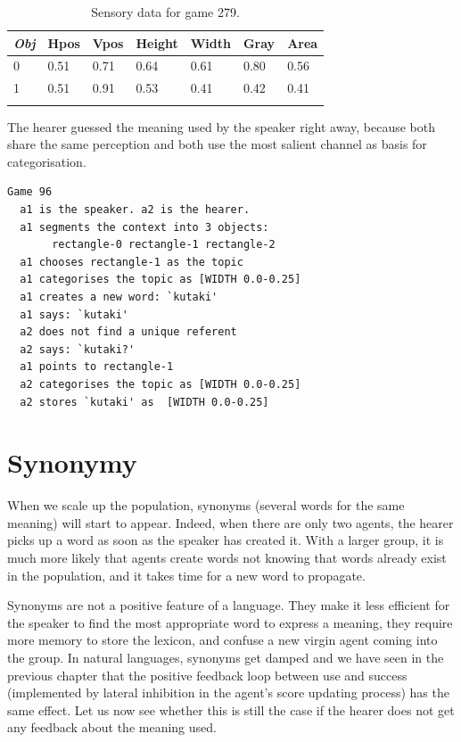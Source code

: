 \begin{table}
\begin{center}
\begin{tabular}{ l  l  l  l  l  l  l }
\lsptoprule
{\itshape Obj}&Hpos&Vpos&Height&Width&Gray&Area \\ \midrule
0 &0.51 & 0.71 & 0.64 & 0.61 & 0.80 & 0.56\\ 
1 & 0.51 & 0.91 & 0.53 & 0.41 & 0.42 & 0.41 \\ 
\lspbottomrule
\end{tabular}
\caption{\label{tab:279} Sensory data for game 279.}
\end{center}
\end{table}
The hearer guessed the meaning used
by the speaker right away, because both 
share the same perception and both use the most 
salient channel as basis for categorisation. 
\begin{verbatim}
Game 96
  a1 is the speaker. a2 is the hearer. 
  a1 segments the context into 3 objects: 
       rectangle-0 rectangle-1 rectangle-2
  a1 chooses rectangle-1 as the topic 
  a1 categorises the topic as [WIDTH 0.0-0.25]
  a1 creates a new word: `kutaki'
  a1 says: `kutaki'
  a2 does not find a unique referent
  a2 says: `kutaki?'
  a1 points to rectangle-1
  a2 categorises the topic as [WIDTH 0.0-0.25]
  a2 stores `kutaki' as  [WIDTH 0.0-0.25]
\end{verbatim}

\section{Synonymy}

When we scale up the population, synonyms (several words
for the same meaning) will start to appear. Indeed,
when there are only two agents, the hearer picks 
up a word as soon as the speaker has created it. With a larger
group, it is much more likely that agents create words
not knowing that words already exist in the population, and 
it takes time for a new word to propagate. 

Synonyms are not a positive feature of a language. They make 
it less efficient for the speaker to find the most 
appropriate word to express a meaning, they require more
memory to store the lexicon, and confuse a new virgin 
agent coming into the group. In natural languages, synonyms get
damped and we have seen in the previous chapter
that the positive feedback loop between 
use and success (implemented by lateral inhibition
in the agent's score updating process) has the same
effect. Let us now see whether this is still the 
case if the hearer does not get any feedback about the
meaning used. 

